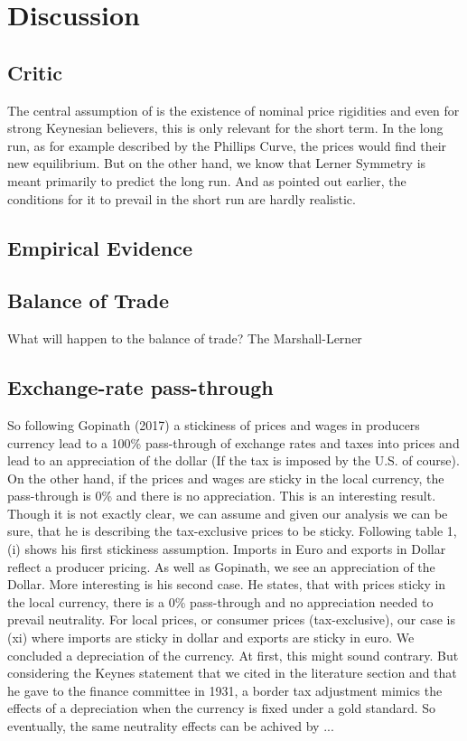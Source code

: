 \section{Discussion} \label{discussion}
\subsection{Critic}
The central assumption of \cite{buiter2017exchange} is the existence of nominal price rigidities and even for strong Keynesian believers, this is only relevant for the short term. In the long run, as for example described by the Phillips Curve, the prices would find their new equilibrium. But on the other hand, we know that Lerner Symmetry is meant primarily to predict the long run. And as pointed out earlier, the conditions for it to prevail in the short run are hardly realistic. 



\subsection{Empirical Evidence}
\subsection{Balance of Trade}
What will happen to the balance of trade?
The Marshall-Lerner 
\subsection{Exchange-rate pass-through}
So following Gopinath (2017) a stickiness of prices and wages in producers currency lead to a 100\% pass-through of exchange rates and taxes into prices and lead to an appreciation of the dollar (If the tax is imposed by the U.S. of course). On the other hand, if the prices and wages are sticky in the local currency, the pass-through is 0\% and there is no appreciation. This is an interesting result. Though it is not exactly clear, we can assume and given our analysis we can be sure, that he is describing the tax-exclusive prices to be sticky. Following table 1, (i) shows his first stickiness assumption. Imports in Euro and exports in Dollar reflect a producer pricing. As well as Gopinath, we see an appreciation of the Dollar. More interesting is his second case. He states, that with prices sticky in the local currency, there is a 0\% pass-through and no appreciation needed to prevail neutrality. For local prices, or consumer prices (tax-exclusive), our case is (xi) where imports are sticky in dollar and exports are sticky in euro. We concluded a depreciation of the currency. At first, this might sound contrary. But considering the Keynes statement that we cited in the literature section and that he gave to the finance committee in 1931, a border tax adjustment mimics the effects of a depreciation when the currency is fixed under a gold standard.  So eventually, the same neutrality effects can be achived by ...
